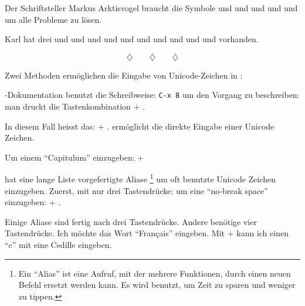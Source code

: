 Der Schriftsteller Markus Arktisvogel braucht die Symbole %
\Esc{}%
und %
\Shift{}%
und %
\Ctrl{}%
und %
\Alt{}%
und %
\Return{}%
und %
\Spacebar{}%
um alle Probleme zu lösen.

Karl hat drei \Spacebar{}%
und %
\Return{}%
und %
\BSpace{}%
und %
\Tab{}%
und %
\Alt{}%
und %
\AltGr{}%
und %
\NumLock{}%
und %
\UArrow{}%
und %
\DArrow{}%
und %
\LArrow{}%
und %
\RArrow{} vorhanden.

$$\diamondsuit\qquad\diamondsuit\qquad\diamondsuit$$

Zwei Methoden ermöglichen die Eingabe von
Unicode-Zeichen in :

-Dokumentation benutzt die Schreibweise: %
\texttt{C-x 8}
um den Vorgang zu beschreiben: man druckt die Tastenkombination
\Ctrl$+$%
\space%
.

In diesem Fall heisst das: %
\Ctrl$+$%
\space%
%
\Return{}%
%
\Return . ermöglicht die direkte Eingabe einer Unicode
Zeichen.

Um einem \enquote{Capitulum} einzugeben: %
\hbox{\Ctrl$+$}%
%
\Return{}%
%
%
%
%
\space%
\Return{}%

%

 hat eine lange Liste vorgefertigte Aliase%
\footnote{Ein \enquote{Alias} ist eine Aufruf, mit der
mehrere Funktionen, durch einen neuen Befehl ersetzt werden kann.
Es wird benutzt, um Zeit zu sparen und weniger zu tippen.}%
um oft benutzte Unicode Zeichen einzugeben. Zuerst, mit nur
drei Tastendrücke: um eine \enquote{no-break space} einzugeben: %
\hbox{\Ctrl$+$}%
%
\Spacebar .

Einige Aliase sind fertig nach drei Tastendrücke. Andere
benötige vier Tastendrücke. Ich möchte das Wort \enquote{Français}
eingeben. Mit %
\hbox{\Ctrl$+$}%
\keystroke{,}%
%
\space%
kann ich einen \enquote{c} mit eine Cedille eingeben.

